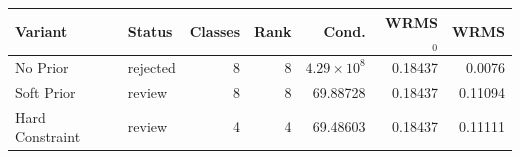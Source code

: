 \begin{tabular}{llrrrrr}
\toprule
Variant & Status & Classes & Rank & Cond. & WRMS$_0$ & WRMS \\
\midrule
No Prior & rejected & 8 & 8 & $4.29\times 10^{8}$ & 0.18437 & 0.0076 \\
Soft Prior & review & 8 & 8 & 69.88728 & 0.18437 & 0.11094 \\
Hard Constraint & review & 4 & 4 & 69.48603 & 0.18437 & 0.11111 \\
\bottomrule
\end{tabular}
